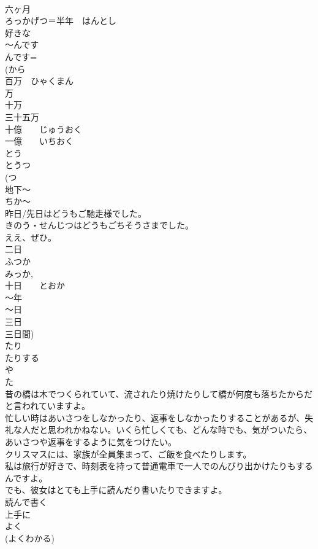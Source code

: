 \documentclass[8pt]{extreport}
\begin{document}
\begin{CJK}{UTF8}{min}
\\	六ヶ月
\\	ろっかげつ＝半年　はんとし	
\\	好きな
\\	～んです
\\	んです= 
\\	(から 
\\	百万　ひゃくまん
\\	万 
\\	十万
\\	三十五万
\\	十億　　じゅうおく
\\	一億　　いちおく
\\	とう
\\	とうつ 
\\	(つ
\\	地下～
\\	ちか～
\\	昨日/先日はどうもご馳走様でした。
\\	きのう・せんじつはどうもごちそうさまでした。
\\	ええ、ぜひ。
\\	二日
\\	ふつか 
\\	みっか, 
\\	十日　　とおか 
\\	～年 
\\	～日 
\\	三日 
\\	三日間)	
\\	たり
\\	たりする
\\	や
\\	た 
\\	昔の橋は木でつくられていて、流されたり焼けたりして橋が何度も落ちたからだと言われていますよ。
\\	忙しい時はあいさつをしなかったり、返事をしなかったりすることがあるが、失礼な人だと思われかねない。いくら忙しくても、どんな時でも、気がついたら、あいさつや返事をするように気をつけたい。
\\	クリスマスには、家族が全員集まって、ご飯を食べたりします。
\\	私は旅行が好きで、時刻表を持って普通電車で一人でのんびり出かけたりもするんですよ。
\\	でも、彼女はとても上手に読んだり書いたりできますよ。
\\	読んで書く 
\\	上手に
\\	よく 
\\	(よくわかる)

\end{CJK}
\end{document}
